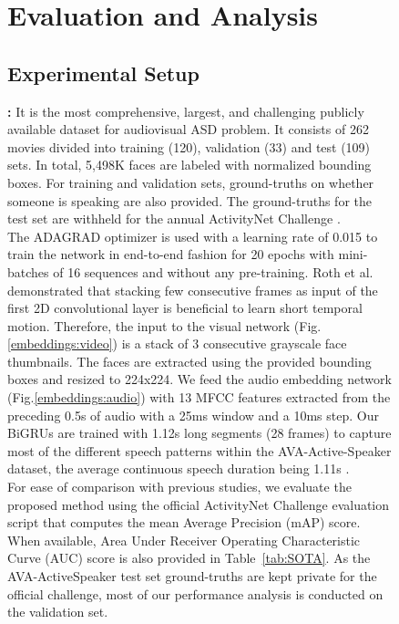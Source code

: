 \documentclass[a4paper]{article}
\begin{document}
\begin{figure}[t]
\section{Evaluation and Analysis}
\label{evaluation}
\subsection{Experimental Setup}
\label{evaluation:setup}

 \cite{AVA}{\bf:} It is the most comprehensive, largest, and challenging publicly available dataset for audiovisual ASD problem. It consists of 262 movies divided into training (120), validation (33) and test (109) sets.
In total, 5,498K faces are labeled with normalized bounding boxes.
For training and validation sets, ground-truths on whether someone is speaking are also provided. The ground-truths for the test set are withheld for the annual ActivityNet Challenge \cite{activitynet_challenge}.\\





The ADAGRAD optimizer \cite{adagrad} is used with a learning rate of 0.015 to train the network in end-to-end fashion for 20 epochs with mini-batches of 16 sequences and without any pre-training. 
Roth et al. \cite{AVA} demonstrated that stacking few consecutive frames as input of the first 2D convolutional layer is beneficial to learn short temporal motion. Therefore, the input to the visual network (Fig.\ref{embeddings:video}) is a stack of 3 consecutive grayscale face thumbnails. The faces are extracted using the provided bounding boxes and resized to 224x224.  We feed the audio embedding network (Fig.\ref{embeddings:audio})
with 13 MFCC features extracted from the preceding 0.5s of audio with a 25ms window and a 10ms step.
Our BiGRUs are trained with 1.12s long segments (28 frames) to capture most of the different speech patterns within the AVA-Active-Speaker dataset, the average continuous speech duration being 1.11s \cite{AVA}.\\












 For ease of comparison with previous studies, we evaluate the proposed method using the official ActivityNet Challenge evaluation script \cite{AVA} that computes the mean Average Precision (mAP) score. When available, Area Under Receiver Operating Characteristic Curve (AUC) score is also provided in Table~\ref{tab:SOTA}.
As the AVA-ActiveSpeaker test set ground-truths are kept private for the official challenge, most of our performance analysis is conducted on the validation set.


\end{figure}
\end{document}
